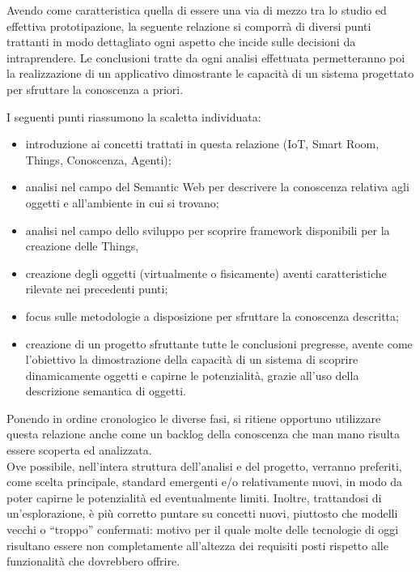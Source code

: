 \documentclass[12pt,a4paper,openright,oneside]{report}
\newcommand{\quotes}[1]{``#1''}
\begin{document}
Avendo come caratteristica quella di essere una via di mezzo tra lo studio ed effettiva prototipazione, la seguente relazione si comporrà di diversi punti trattanti in modo dettagliato ogni aspetto che incide sulle decisioni da intraprendere. Le conclusioni tratte da ogni analisi effettuata permetteranno poi la realizzazione di un applicativo dimostrante le capacità di un sistema progettato per sfruttare la conoscenza a priori. 

I seguenti punti riassumono la scaletta individuata:

\begin{itemize}
	\item introduzione ai concetti trattati in questa relazione (IoT, Smart Room, Things, Conoscenza, Agenti);
	
	\item analisi nel campo del Semantic Web per descrivere la conoscenza relativa agli oggetti e all'ambiente in cui si trovano;
	
	\item analisi nel campo dello sviluppo per scoprire framework disponibili per la creazione delle Things,
	
	\item creazione degli oggetti (virtualmente o fisicamente) aventi caratteristiche rilevate nei precedenti punti;
	
	\item focus sulle metodologie a disposizione per sfruttare la conoscenza descritta;
	
	\item creazione di un progetto sfruttante tutte le conclusioni pregresse, avente come l'obiettivo la dimostrazione della capacità di un sistema di scoprire dinamicamente oggetti e capirne le potenzialità, grazie all'uso della descrizione semantica di oggetti.
	
\end{itemize}

Ponendo in ordine cronologico le diverse fasi, si ritiene opportuno utilizzare questa relazione anche come un backlog della conoscenza che man mano risulta essere scoperta ed analizzata.\\

\label{new_tecnologies}
Ove possibile, nell'intera struttura dell'analisi e del progetto, verranno preferiti, come scelta principale, standard emergenti e/o relativamente nuovi, in modo da poter capirne le potenzialità ed eventualmente limiti. Inoltre, trattandosi di un'esplorazione, è più corretto puntare su concetti nuovi, piuttosto che modelli vecchi o \quotes{troppo} confermati: motivo per il quale molte delle tecnologie di oggi risultano essere non completamente all'altezza dei requisiti posti rispetto alle funzionalità che dovrebbero offrire.
\end{document}
